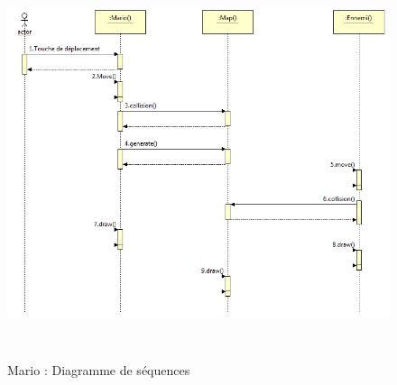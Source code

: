 \begin{figure}[h]
 \centering
 \includegraphics[height=11.5cm]{../umls/UML_images/Mario/Sequence} \hfill
 \caption{Mario : Diagramme de séquences}
\end{figure}


\clearpage

